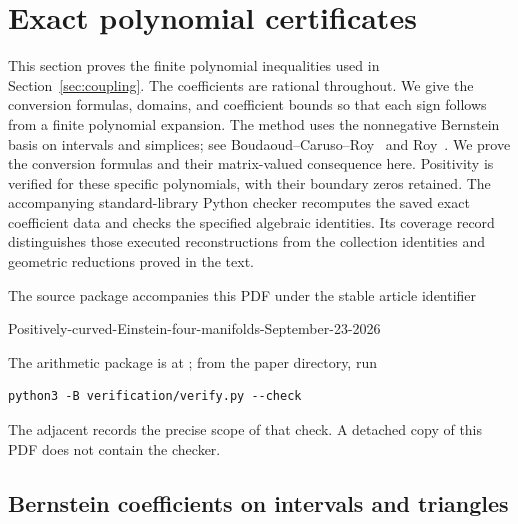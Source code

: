 \section{Exact polynomial certificates}\label{sec:certificates}

This section proves the finite polynomial inequalities used in
Section~\ref{sec:coupling}. The coefficients are rational throughout.
We give the conversion formulas, domains, and coefficient bounds so
that each sign follows from a finite polynomial expansion.
The method uses the nonnegative Bernstein basis on intervals and
simplices; see Boudaoud--Caruso--Roy~\cite{BoudaoudCarusoRoy2008} and
Roy~\cite[Sections~1 and~4]{Roy2007}. We prove the conversion formulas
and their matrix-valued consequence here. Positivity is verified for
these specific polynomials, with their boundary zeros retained.
The accompanying standard-library Python checker recomputes the saved
exact coefficient data and checks the specified algebraic identities.
Its coverage record distinguishes those executed reconstructions from
the collection identities and geometric reductions proved in the text.

The source package accompanies this PDF under the stable article identifier
\begin{center}
\small\ttfamily Positively-curved-Einstein-four-manifolds-September-23-2026
\end{center}
The arithmetic package is at ; from
the paper directory, run
\begin{verbatim}
python3 -B verification/verify.py --check
\end{verbatim}
The adjacent  records the precise scope of that check.
A detached copy of this PDF does not contain the checker.

\subsection{Bernstein coefficients on intervals and triangles}

